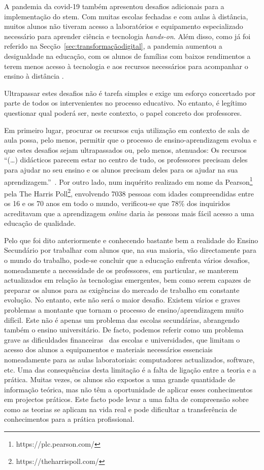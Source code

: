A pandemia da \acrshort{covid-19} também apresentou desafios adicionais para a implementação do \acrshort{stem}. Com muitas escolas fechadas e com aulas à distância, muitos alunos não tiveram acesso a laboratórios e equipamento especializado necessário para aprender ciência e tecnologia \textit{hands-on}. Além disso, como já foi referido na Secção~\ref{sec:transformaçãodigital}, a pandemia aumentou a desigualdade na educação, com os alunos de famílias com baixos rendimentos a terem menos acesso à tecnologia e aos recursos necessários para acompanhar o ensino à distância \cite{desigualdadespandemia, efeitospandemiadigital}.

Ultrapassar estes desafios não é tarefa simples e exige um esforço concertado por parte de todos os intervenientes no processo educativo. No entanto, é legítimo questionar qual poderá ser, neste contexto, o papel concreto dos professores.

Em primeiro lugar, procurar os recursos cuja utilização em contexto de sala de aula possa, pelo menos, permitir que o processo de ensino-aprendizagem evolua e que estes desafios sejam ultrapassados ou, pelo menos, atenuados: Os recursos ``(\ldots) didácticos parecem estar no centro de tudo, os professores precisam deles para ajudar no seu ensino e os alunos precisam deles para os ajudar na sua aprendizagem.''~\cite{virtuallabng}. Por outro lado, num inquérito \cite{pearson} realizado em nome da Pearson\footnote{https://plc.pearson.com/} pela The Harris Poll\footnote{https://theharrispoll.com/}, envolvendo 7038 pessoas com idades compreendidas entre os 16 e os 70 anos em todo o mundo, verificou-se que 78\% dos inquiridos acreditavam que a aprendizagem \textit{online} daria às pessoas mais fácil acesso a uma educação de qualidade. 

Pelo que foi dito anteriormente e conhecendo bastante bem a realidade do Ensino Secundário por trabalhar com alunos que, na sua maioria, vão directamente para o mundo do trabalho, pode-se concluir que a educação enfrenta vários desafios, nomeadamente a necessidade de os professores, em particular, se manterem actualizados em relação às tecnologias emergentes, bem como serem capazes de preparar os alunos para as exigências do mercado de trabalho em constante evolução. No entanto, este não será o maior desafio. Existem vários e graves problemas a montante que tornam o processo de ensino/aprendizagem muito difícil. Este não é apenas um problema das escolas secundárias, abrangendo também o ensino universitário. De facto, podemos referir como um problema grave as dificuldades financeiras~\cite{dificuldadesfinanciamento, Financiamentoprofissional, Educacaofinanciamento} das escolas e universidades, que limitam o acesso dos alunos a equipamentos e materiais necessários essenciais nomeadamente para as aulas laboratoriais: computadores actualizados, software, etc. Uma das consequências desta limitação é a falta de ligação entre a teoria e a prática. Muitas vezes, os alunos são expostos a uma grande quantidade de informação teórica, mas não têm a oportunidade de aplicar esses conhecimentos em projectos práticos. Este facto pode levar a uma falta de compreensão sobre como as teorias se aplicam na vida real e pode dificultar a transferência de conhecimentos para a prática profissional.

